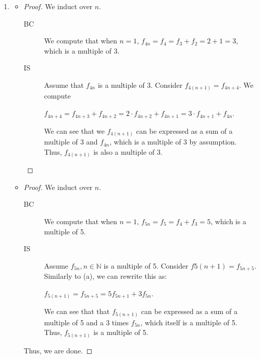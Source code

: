 \documentclass[12pt]{article}
\begin{document}
\begin{enumerate}[start = 1, label = {\bfseries Question \arabic*:}, leftmargin=1in]
    \item
\begin{itemize}
        \item[(a)] \begin{proof}We induct over $n$.\begin{description}
            \item[BC] We compute that when $n=1$, $f_{4n}=f_4=f_3+f_2=2+1=3$, which is a multiple of 3.
            \item[IS] Assume that $f_{4n}$ is a multiple of 3. Consider $f_{4(n+1)}=f_{4n+4}$. We compute \begin{center}
                $f_{4n+4}=f_{4n+3}+f_{4n+2}=2\cdot f_{4n+2}+f_{4n+1}=3\cdot f_{4n+1}+f_{4n}$.
            \end{center} We can see that we $f_{4(n+1)}$ can be expressed as a sum of a multiple of 3 and $f_{4n}$, which is a multiple of 3 by assumption.
            Thus, $f_{4(n+1)}$ is also a multiple of 3.
        \end{description}
    \end{proof}
        \item[(b)] \begin{proof}We induct over $n$.\begin{description}
            \item[BC] We compute that when $n=1$, $f_{5n}=f_5=f_4+f_3=5$, which is a multiple of 5.
            \item[IS] Assume $f_{5n}, n\in \mathbb{N}$ is a multiple of 5. Consider $f{5(n+1)}=f_{5n+5}$. Similarly to (a), we can rewrite this as:\begin{center}
                $f_{5(n+1)}=f_{5n+5}=5f_{5n+1}+3f_{5n}$.
            \end{center} We can see that that $f_{5(n+1)}$ can be expressed as a sum of a multiple of 5 and a 3 times $f_{5n}$, which itself is a multiple of 5. Thus, $f_{5(n+1)}$ is a multiple of 5.
        \end{description} Thus, we are done.
    \end{proof}


\end{itemize}
\end{enumerate}
\end{document}
